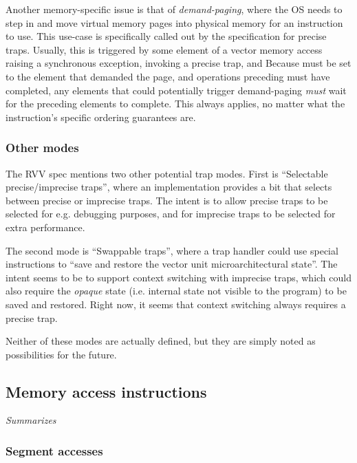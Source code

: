 Another memory-specific issue is that of \emph{demand-paging}, where the OS needs to step in and move virtual memory pages into physical memory for an instruction to use.
This use-case is specifically called out by the specification for precise traps.
Usually, this is triggered by some element of a vector memory access raising a synchronous exception, invoking a precise trap, and 
Because  must be set to the element that demanded the page, and operations preceding  must have completed, any elements that could potentially trigger demand-paging \emph{must} wait for the preceding elements to complete.
This always applies, no matter what the instruction's specific ordering guarantees are.

\subsubsection{Other modes}
The RVV spec mentions two other potential trap modes.
First is \enquote{Selectable precise/imprecise traps}, where an implementation provides a bit that selects between precise or imprecise traps.
The intent is to allow precise traps to be selected for e.g. debugging purposes, and for imprecise traps to be selected for extra performance.

The second mode is \enquote{Swappable traps}, where a trap handler could use special instructions to \enquote{save and restore the vector unit microarchitectural state}.
The intent seems to be to support context switching with imprecise traps, which could also require the \emph{opaque} state (i.e. internal state not visible to the program) to be saved and restored.
Right now, it seems that context switching always requires a precise trap.

Neither of these modes are actually defined, but they are simply noted as possibilities for the future.

\pagebreak
\subsection{Memory access instructions}
\emph{Summarizes \cite[Sections 7-9]{RISCVVectorExtension2021}}



\subsubsection{Segment accesses}

